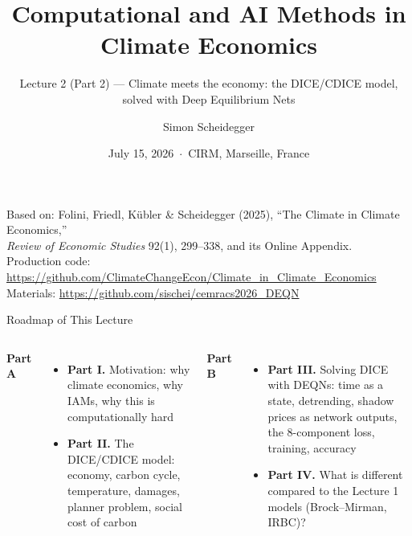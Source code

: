 \documentclass[aspectratio=169,11pt]{beamer}
\title[CEMRACS 2026 $\cdot$ DICE]
{Computational and AI Methods in Climate Economics}
\subtitle{Lecture 2 (Part 2) --- Climate meets the economy: the DICE/CDICE model, solved with Deep Equilibrium Nets}
\author{Simon Scheidegger}
\institute[HEC Lausanne]{HEC Lausanne $\cdot$ Grantham Research Institute, LSE}
\date{July 15, 2026 \,$\cdot$\, CIRM, Marseille, France}
\begin{document}

{
\begin{frame}
\titlepage
\vspace{-0.4cm}
\begin{center}
{\footnotesize Based on: Folini, Friedl, K\"ubler \& Scheidegger (2025), ``The Climate in Climate Economics,''\\
\emph{Review of Economic Studies} 92(1), 299--338, and its Online Appendix.}\\[4pt]
{\footnotesize Production code: \url{https://github.com/ClimateChangeEcon/Climate_in_Climate_Economics}}\\[2pt]
{\footnotesize Materials: \url{https://github.com/sischei/cemracs2026_DEQN}}
\end{center}
\end{frame}
}

\begin{frame}{Roadmap of This Lecture}
\vspace{0.2em}
\begin{columns}[T]
\textbf{Part A}
\begin{itemize}
    \item \textbf{Part I.} Motivation: why climate economics, why IAMs, why this is computationally hard
    \item \textbf{Part II.} The DICE/CDICE model: economy, carbon cycle, temperature, damages, planner problem, social cost of carbon
\end{itemize}

\textbf{Part B}
\begin{itemize}
    \item \textbf{Part III.} Solving DICE with DEQNs: time as a state, detrending, shadow prices as network outputs, the 8-component loss, training, accuracy
    \item \textbf{Part IV.} What is different compared to the Lecture 1 models (Brock--Mirman, IRBC)?
\end{itemize}
\end{columns}
\end{frame}
\end{document}
